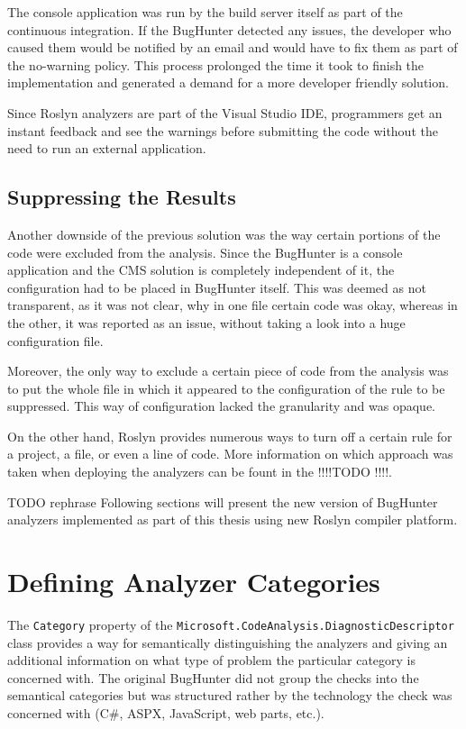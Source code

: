 \documentclass[
  digital, %
  table,   %
  lof,     %
  lot,     %
  oneside,
]{fithesis3}
\begin{document}
The console application was run by the build server itself as part of the continuous integration. If the BugHunter detected any issues, the developer who caused them would be notified by an email and would have to fix them as part of the no-warning policy. This process prolonged the time it took to finish the implementation and generated a demand for a more developer friendly solution. 

Since Roslyn analyzers are part of the Visual Studio IDE, programmers get an instant feedback and see the warnings before submitting the code without the need to run an external application.

\subsection{Suppressing the Results}
Another downside of the previous solution was the way certain portions of the code were excluded from the analysis. Since the BugHunter is a console application and the CMS solution is completely independent of it, the configuration had to be placed in BugHunter itself. This was deemed as not transparent, as it was not clear, why in one file certain code was okay, whereas in the other, it was reported as an issue, without taking a look into a huge configuration file.

Moreover, the only way to exclude a certain piece of code from the analysis was to put the whole file in which it appeared to the configuration of the rule to be suppressed. This way of configuration lacked the granularity and was opaque. 

On the other hand, Roslyn provides numerous ways to turn off a certain rule for a project, a file, or even a line of code. More information on which approach was taken when deploying the analyzers can be fount in the !!!!TODO !!!!.

\bigskip\noindent
TODO rephrase
Following sections will present the new version of BugHunter analyzers implemented as part of this thesis using new Roslyn compiler platform.

\section{Defining Analyzer Categories}
The \texttt{Category} property of the \texttt{Microsoft.CodeAnalysis.DiagnosticDescriptor} class provides a way for semantically distinguishing the analyzers and giving an additional information on what type of problem the particular category is concerned with. The original BugHunter did not group the checks into the semantical categories but was structured rather by the technology the check was concerned with (C\#, ASPX, JavaScript, web parts, etc.). 
\end{document}
